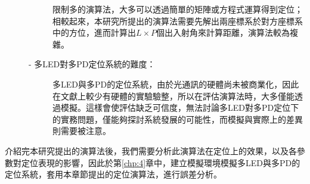 \begin{description}
\begin{description}
        \qquad
        限制多的演算法，大多可以透過簡單的矩陣或方程式運算得到定位；相較起來，本研究所提出的演算法需要先解出兩座標系於對方座標系中的方位，進而計算出$L\times P$個出入射角來計算距離，演算法較為複雜。

        \item[- 多LED對多PD定位系統的難度：] \hfill
        
        \qquad
        多LED與多PD的定位系統，由於光通訊的硬體尚未被商業化，因此在文獻上較少有硬體的實驗驗整，所以在評估演算法時，大多僅能透過模擬。這樣會使評估缺乏可信度，無法討論多LED對多PD定位下的實務問題，僅能夠探討系統發展的可能性，而模擬與實際上的差異則需要被注意。
    \end{description}
    
\end{description}

\hfill

介紹完本研究提出的演算法後，我們需要分析此演算法在定位上的效果，以及各參數對定位表現的影響，因此於第\ref{chp:4}章中，建立模擬環境模擬多LED與多PD的定位系統，套用本章節提出的定位演算法，進行誤差分析。










